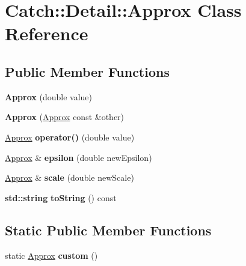\hypertarget{class_catch_1_1_detail_1_1_approx}{}\section{Catch\+:\+:Detail\+:\+:Approx Class Reference}
\label{class_catch_1_1_detail_1_1_approx}
\subsection*{Public Member Functions}
\begin{DoxyCompactItemize}
\item 
\mbox{\label{class_catch_1_1_detail_1_1_approx_a1a8618ea8db08c66bd3d9fe8f74b957a}} 
{\bfseries Approx} (double value)
\item 
\mbox{\label{class_catch_1_1_detail_1_1_approx_a807330c63266fc914abdf6e461255a54}} 
{\bfseries Approx} (\hyperlink{class_catch_1_1_detail_1_1_approx}{Approx} const \&other)
\item 
\mbox{\label{class_catch_1_1_detail_1_1_approx_a48c9cbc28a05dc9dc8c3973b9eae2268}} 
\hyperlink{class_catch_1_1_detail_1_1_approx}{Approx} {\bfseries operator()} (double value)
\item 
\mbox{\label{class_catch_1_1_detail_1_1_approx_a05c50c3ad0a971fab19345b5d94979a9}} 
\hyperlink{class_catch_1_1_detail_1_1_approx}{Approx} \& {\bfseries epsilon} (double new\+Epsilon)
\item 
\mbox{\label{class_catch_1_1_detail_1_1_approx_acd80f0737bf38112beacd5ca95bef113}} 
\hyperlink{class_catch_1_1_detail_1_1_approx}{Approx} \& {\bfseries scale} (double new\+Scale)
\item 
\mbox{\label{class_catch_1_1_detail_1_1_approx_a972fd9ac60607483263f1b0f0f9955e6}} 
\textbf{ std\+::string} {\bfseries to\+String} () const
\end{DoxyCompactItemize}
\subsection*{Static Public Member Functions}
\begin{DoxyCompactItemize}
\item 
\mbox{\label{class_catch_1_1_detail_1_1_approx_aaf86dc0ee92272ac2d9839197a07951d}} 
static \hyperlink{class_catch_1_1_detail_1_1_approx}{Approx} {\bfseries custom} ()
\end{DoxyCompactItemize}
